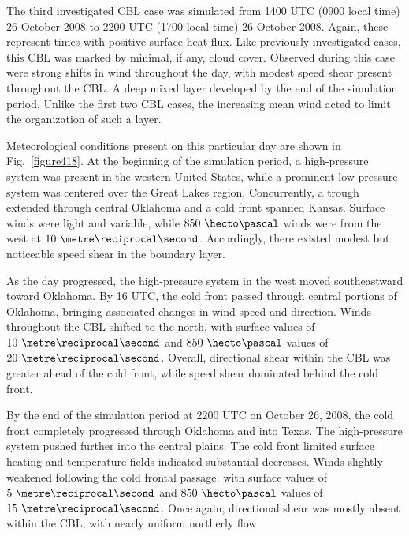 The third investigated CBL case was simulated from 1400 UTC (0900 local time) 26 October 2008 to 2200 UTC (1700 local time) 26 October 2008. Again, these represent times with positive surface heat flux. Like previously investigated cases, this CBL was marked by minimal, if any, cloud cover. Observed during this case were strong shifts in wind throughout the day, with modest speed shear present throughout the CBL. A deep mixed layer developed by the end of the simulation period. Unlike the first two CBL cases, the increasing mean wind acted to limit the organization of such a layer. 

Meteorological conditions present on this particular day are shown in Fig.~\ref{figure418}. At the beginning of the simulation period, a high-pressure system was present in the western United States, while a prominent low-pressure system was centered over the Great Lakes region. Concurrently, a trough extended through central Oklahoma and a cold front spanned Kansas. Surface winds were light and variable, while $850\mbox{ }\hecto\pascal$ winds were from the west at $10\mbox{ }\metre\reciprocal\second$. Accordingly, there existed modest but noticeable speed shear in the boundary layer. 

As the day progressed, the high-pressure system in the west moved southeastward toward Oklahoma. By 16 UTC, the cold front passed through central portions of Oklahoma, bringing associated changes in wind speed and direction. Winds throughout the CBL shifted to the north, with surface values of $10\mbox{ }\metre\reciprocal\second$ and $850\mbox{ }\hecto\pascal$ values of $20\mbox{ }\metre\reciprocal\second$. Overall, directional shear within the CBL was greater ahead of the cold front, while speed shear dominated behind the cold front.

By the end of the simulation period at 2200 UTC on October 26, 2008, the cold front completely progressed through Oklahoma and into Texas. The high-pressure system pushed further into the central plains. The cold front limited surface heating and temperature fields indicated substantial decreases. Winds slightly weakened following the cold frontal passage, with surface values of $5\mbox{ }\metre\reciprocal\second$ and $850\mbox{ }\hecto\pascal$ values of $15\mbox{ }\metre\reciprocal\second$. Once again, directional shear was mostly absent within the CBL, with nearly uniform northerly flow.

